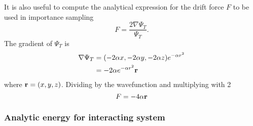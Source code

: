 \documentclass[english, a4paper]{article}
\begin{document}
\noindent It is also useful to compute the analytical expression for the drift force $F$ to be used in importance sampling
\begin{equation}
 F = \frac{2\nabla \Psi_T}{\Psi_T}.
\end{equation}
The gradient of $\Psi_T$ is
\begin{align}
 \nabla \Psi_T &= (-2\alpha x, -2\alpha y, -2\alpha z)e^{-\alpha r^2} \\
               &= -2\alpha e^{-\alpha r^2} \bf{r}
\end{align}
where ${\bf r} = (x, y, z)$.
Dividing by the wavefunction and multiplying with 2
\begin{equation}
 F = -4\alpha \bf{r}
\end{equation}


\subsubsection{Analytic energy for interacting system}
\end{document}
